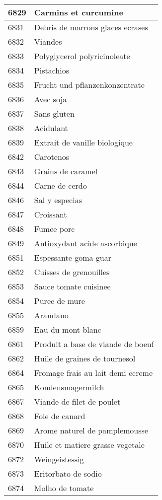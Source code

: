 \begin{longtable}{|l|l|}
6829 & Carmins et curcumine \\ \hline 
6831 & Debris de marrons glaces ecrases \\ \hline 
6832 & Viandes \\ \hline 
6833 & Polyglycerol polyricinoleate \\ \hline 
6834 & Pistachios \\ \hline 
6835 & Frucht und pflanzenkonzentrate \\ \hline 
6836 & Avec soja \\ \hline 
6837 & Sans gluten \\ \hline 
6838 & Acidulant \\ \hline 
6839 & Extrait de vanille biologique \\ \hline 
6842 & Carotenos \\ \hline 
6843 & Grains de caramel \\ \hline 
6844 & Carne de cerdo \\ \hline 
6846 & Sal y especias \\ \hline 
6847 & Croissant \\ \hline 
6848 & Fumee porc \\ \hline 
6849 & Antioxydant acide ascorbique \\ \hline 
6851 & Espessante goma guar \\ \hline 
6852 & Cuisses de grenouilles \\ \hline 
6853 & Sauce tomate cuisinee \\ \hline 
6854 & Puree de mure \\ \hline 
6855 & Arandano \\ \hline 
6859 & Eau du mont blanc \\ \hline 
6861 & Produit a base de viande de boeuf \\ \hline 
6862 & Huile de graines de tournesol \\ \hline 
6864 & Fromage frais au lait demi ecreme \\ \hline 
6865 & Kondensmagermilch \\ \hline 
6867 & Viande de filet de poulet \\ \hline 
6868 & Foie de canard \\ \hline 
6869 & Arome naturel de pamplemousse \\ \hline 
6870 & Huile et matiere grasse vegetale \\ \hline 
6872 & Weingeistessig \\ \hline 
6873 & Eritorbato de sodio \\ \hline 
6874 & Molho de tomate \\ \hline 

\end{longtable}
